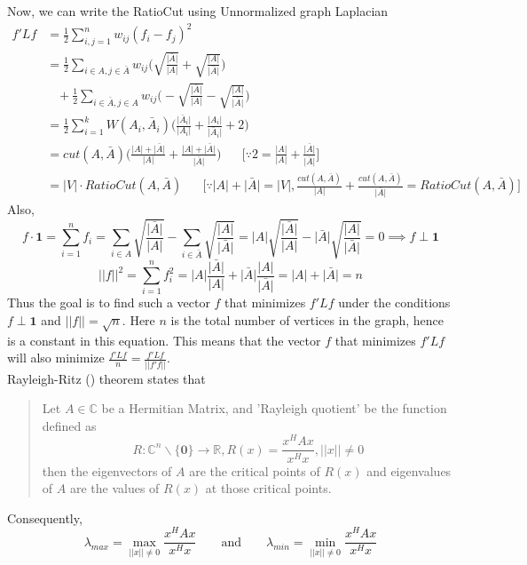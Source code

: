 \documentclass[10pt,a4paper, nocenter]{report}
\newcommand{\abs}[1]{\lvert {#1} \rvert}
\newcommand{\norm}[1]{\lvert\lvert {#1} \rvert\rvert}
\begin{document}
	Now, we can write the RatioCut using Unnormalized graph Laplacian
	\begin{align*}
		f'Lf &= \frac{1}{2}\sum_{i,j=1}^{n}w_{ij}(f_{i}-f_{j})^{2}\\
		&= \frac{1}{2} \sum_{i\in A, j\in \bar{A}} w_{ij} \bigg(\sqrt{\frac{\lvert \bar{A} \rvert}{\lvert A \rvert}} + \sqrt{\frac{\lvert A \rvert}{\lvert \bar{A} \rvert}}\bigg)\\
		& \hspace{10pt}+ \frac{1}{2} \sum_{i\in \bar{A}, j\in A} w_{ij} \bigg(-\sqrt{\frac{\lvert \bar{A} \rvert}{\lvert A \rvert}} - \sqrt{\frac{\lvert A \rvert}{\lvert \bar{A} \rvert}}\bigg)\\
		&= \frac{1}{2}\sum_{i=1}^{k}W(A_{i},\bar{A}_{i})\bigg(\frac{\lvert \bar{A}_{i} \rvert}{\lvert A_{i} \rvert} + \frac{\lvert A_{i} \rvert}{\lvert \bar{A}_{i} \rvert} + 2\bigg)\\
		&= cut(A,\bar{A})\bigg(\frac{\abs{A} + \abs{\bar{A}}}{\abs{A}} + \frac{\abs{A} + \abs{\bar{A}}}{\abs{\bar{A}}}\bigg) \hspace{20pt}\bigg[\because 2 = \frac{\abs{A}}{\abs{A}} + \frac{\abs{\bar{A}}}{\abs{\bar{A}}}\bigg]\\
		&= \abs{V}\cdot RatioCut(A,\bar{A}) \hspace{20pt} \bigg[\because \abs{A}+\abs{\bar{A}} = \abs{V}, \frac{cut(A,\bar{A})}{\abs{A}} + \frac{cut(A,\bar{A})}{\abs{\bar{A}}} = RatioCut(A,\bar{A})\bigg]
	\end{align*}
	Also,
	$$ f\cdot\mathbf{1} = \sum_{i=1}^{n}f_{i} = \sum_{i\in A} \sqrt{\frac{\abs{\bar{A}}}{\abs{A}}} - \sum_{i\in \bar{A}} \sqrt{\frac{\abs{A}}{\abs{\bar{A}}}} = \abs{A} \sqrt{\frac{\abs{\bar{A}}}{\abs{A}}} - \abs{\bar{A}} \sqrt{\frac{\abs{A}}{\abs{\bar{A}}}} =0 \implies f \perp \mathbf{1} $$
	$$ \norm{f}^{2} = \sum_{i=1}^{n}f_{i}^{2} = \abs{A} \frac{\abs{\bar{A}}}{\abs{A}} + \abs{\bar{A}} \frac{\abs{A}}{\abs{\bar{A}}} = \abs{A}+\abs{\bar{A}} = n
	$$
	Thus the goal is to find such a vector $f$ that minimizes $f'Lf$ under the conditions $f \perp \mathbf{1}$ and $\norm{f} = \sqrt{n}$. Here $n$ is the total number of vertices in the graph, hence is a constant in this equation. This means that the vector $f$ that minimizes $f'Lf$ will also minimize $\frac{f'Lf}{n} = \frac{f'Lf}{\norm{f'f}} $. \\
	
	Rayleigh-Ritz (\cite{lutkepohl:97}) theorem states that
	\begin{quote}
		Let $A \in \mathbb{C}$ be a Hermitian Matrix, and 'Rayleigh quotient' be the function defined as $$R: \mathbb{C}^{n} \backslash \{\mathbf{0}\}\to \mathbb{R}, 
	 R(x) = \frac{x^{H}Ax}{x^{H}x}, \norm{x}\neq 0 $$ then the eigenvectors of $A$ are the critical points of $R(x)$ and eigenvalues of $A$ are the values of $R(x)$ at those critical points. 
	\end{quote}
	Consequently, 
	$$ \lambda_{max} = \max_{\norm{x}\neq 0}\frac{x^{H}Ax}{x^{H}x} \hspace{20pt} \text{ and } \hspace{20pt} \lambda_{min} = \min_{\norm{x}\neq 0}\frac{x^{H}Ax}{x^{H}x} $$
	
\end{document}
